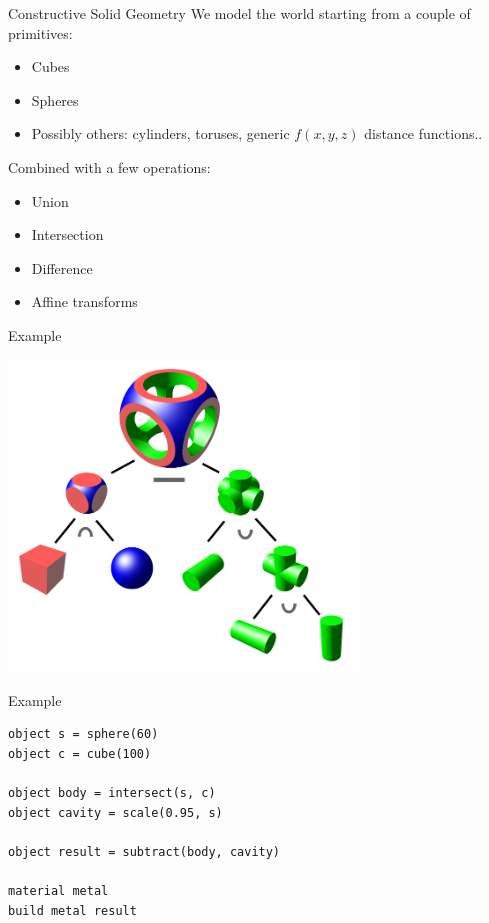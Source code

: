 \documentclass[utf8x]{beamer}
\begin{document}
\begin{frame}{Constructive Solid Geometry}
We model the world starting from a couple of primitives:
\begin{itemize}
\item Cubes
\item Spheres
\item Possibly others: cylinders, toruses, generic $f(x,y,z)$ distance 
      functions..
\end{itemize}
Combined with a few operations:
\begin{itemize}
\item Union
\item Intersection
\item Difference
\item Affine transforms
\end{itemize}
\end{frame}

\begin{frame}{Example}
\begin{center}
\includegraphics[width=0.7\textwidth]{wikicsg}
\end{center}
\end{frame}

\begin{frame}[fragile]{Example}
\begin{lstlisting}
object s = sphere(60) 
object c = cube(100)

object body = intersect(s, c)
object cavity = scale(0.95, s)

object result = subtract(body, cavity)

material metal
build metal result
\end{lstlisting}
\end{frame}
\end{document}
